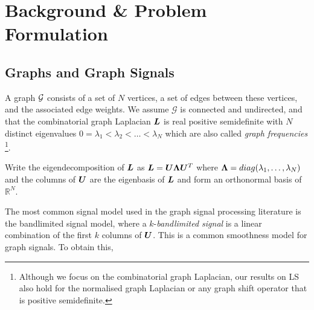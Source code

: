 \section{Background \& Problem Formulation}


\subsection{Graphs and Graph Signals}
\label{sec:signal_model}
A graph $\mathcal{G}$ consists of a set of $N$ vertices, a set of edges between these vertices, and the associated edge weights. We assume $\mathcal{G}$ is connected and undirected, and that the combinatorial graph Laplacian $\bm{L}$ is real positive semidefinite with $N$ distinct eigenvalues $0 = \lambda_{1} < \lambda_{2} < \ldots < \lambda_{N}$ which are also called \emph{graph frequencies} \cite{ortega2018graph}\footnote{Although we focus on the combinatorial graph Laplacian, our results on LS also hold for the normalised graph Laplacian or any graph shift operator that is positive semidefinite.}. {\color{black}Write the eigendecomposition of $\bm{L}$ as $\bm{L} = \bm{U}\bm{\Lambda}\bm{U}^{T}$ where $\bm{\Lambda} = diag(\lambda_{1},\ldots,\lambda_{N})$ and the columns of $\bm{U}$ are the eigenbasis of $\bm{L}$ and form an orthonormal basis of $\mathbb{R}^{N}$.

}
The most common signal model used in the graph signal processing literature is the bandlimited signal model, where a $k$-\emph{bandlimited signal} is a linear combination of the first $k$ columns of $\bm{U}$\cite{EOptimalChen}. This is a common smoothness model for graph signals. To obtain this, 

